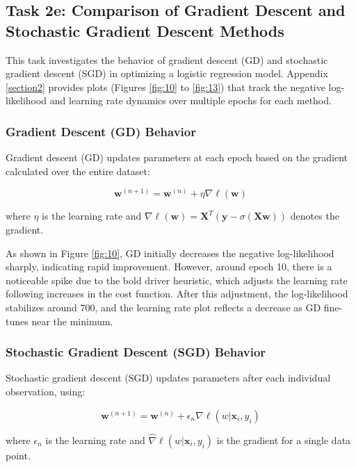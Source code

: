 \documentclass[a4paper,oneside,bibliography=totoc]{scrartcl}
\begin{document}
\subsection{Task 2e: Comparison of Gradient Descent and Stochastic Gradient Descent Methods}

This task investigates the behavior of gradient descent (GD) and stochastic gradient descent (SGD) in optimizing a logistic regression model. Appendix \ref{section2} provides plots (Figures \ref{fig:10} to \ref{fig:13}) that track the negative log-likelihood and learning rate dynamics over multiple epochs for each method.

\subsubsection{Gradient Descent (GD) Behavior}
Gradient descent (GD) updates parameters at each epoch based on the gradient calculated over the entire dataset:

\begin{equation}
    \mathbf{w}^{(n+1)} = \mathbf{w}^{(n)} + \eta \nabla \ell(\mathbf{w})
\end{equation}

where $\eta$ is the learning rate and $\nabla \ell(\mathbf{w}) = \mathbf{X}^T (\mathbf{y} - \sigma(\mathbf{X} \mathbf{w}))$ denotes the gradient.

As shown in Figure \ref{fig:10}, GD initially decreases the negative log-likelihood sharply, indicating rapid improvement. However, around epoch 10, there is a noticeable spike due to the bold driver heuristic, which adjusts the learning rate following increases in the cost function. After this adjustment, the log-likelihood stabilizes around 700, and the learning rate plot reflects a decrease as GD fine-tunes near the minimum.

\subsubsection{Stochastic Gradient Descent (SGD) Behavior}
Stochastic gradient descent (SGD) updates parameters after each individual observation, using:

\begin{equation}
    \mathbf{w}^{(n+1)} = \mathbf{w}^{(n)} + \epsilon_n \hat{\nabla} \ell(w|\mathbf{x}_i, y_i)
\end{equation}

where $\epsilon_n$ is the learning rate and $\hat{\nabla} \ell(w|\mathbf{x}_i, y_i)$ is the gradient for a single data point.
\end{document}
